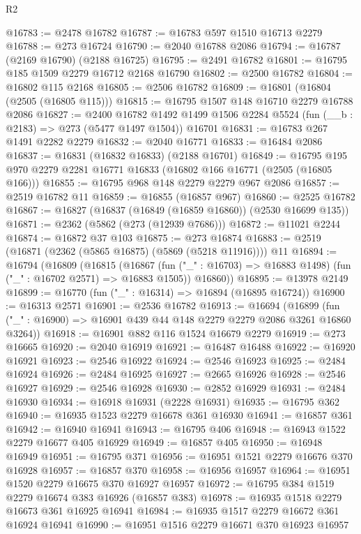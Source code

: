 \begin{lexlean}{R2}
\begin{coremodule}
@16783 := @2478 @16782
@16787 := @16783 @597 @1510 @16713 @2279
@16788 := @273 @16724
@16790 := @2040 @16788 @2086
@16794 := @16787 (@2169 @16790) (@2188 @16725)
@16795 := @2491 @16782
@16801 := @16795 @185 @1509 @2279 @16712 @2168 @16790
@16802 := @2500 @16782
@16804 := @16802 @115 @2168
@16805 := @2506 @16782
@16809 := @16801 (@16804 (@2505 (@16805 @115)))
@16815 := @16795 @1507 @148 @16710 @2279 @16788 @2086
@16827 := @2400
    @16782
    @1492
    @1499
    @1506
    @2284
    @5524
    (fun (__b : @2183) => @273 (@5477 @1497 @1504))
    @16701
@16831 := @16783 @267 @1491 @2282 @2279
@16832 := @2040 @16771
@16833 := @16484 @2086
@16837 := @16831 (@16832 @16833) (@2188 @16701)
@16849 := @16795 @195 @970 @2279 @2281 @16771 @16833 (@16802 @166 @16771 (@2505 (@16805 @166)))
@16855 := @16795 @968 @148 @2279 @2279 @967 @2086
@16857 := @2519 @16782 @11
@16859 := @16855 (@16857 @967)
@16860 := @2525 @16782
@16867 := @16827 (@16837 (@16849 (@16859 @16860)) (@2530 @16699 @135))
@16871 := @2362 (@5862 (@273 (@12939 @7686)))
@16872 := @11021 @2244
@16874 := @16872 @37 @103
@16875 := @273 @16874
@16883 := @2519 (@16871 (@2362 (@5865 @16875) (@5869 (@5218 @11916)))) @11
@16894 := @16794
    (@16809
      (@16815
        (@16867 (fun ("_" : @16703) => @16883 @1498) (fun ("_" : @16702 @2571) => @16883 @1505))
        @16860))
@16895 := @13978 @2149
@16899 := @16770 (fun ("_" : @16314) => @16894 (@16895 @16724))
@16900 := @16313 @2571
@16901 := @2536 @16782
@16913 := @16694
    (@16899 (fun ("_" : @16900) => @16901 @439 @44 @148 @2279 @2279 @2086 @3261 @16860 @3264))
@16918 := @16901 @882 @116 @1524 @16679 @2279
@16919 := @273 @16665
@16920 := @2040 @16919
@16921 := @16487 @16488
@16922 := @16920 @16921
@16923 := @2546 @16922
@16924 := @2546 @16923
@16925 := @2484 @16924
@16926 := @2484 @16925
@16927 := @2665 @16926
@16928 := @2546 @16927
@16929 := @2546 @16928
@16930 := @2852 @16929
@16931 := @2484 @16930
@16934 := @16918 @16931 (@2228 @16931)
@16935 := @16795 @362
@16940 := @16935 @1523 @2279 @16678 @361 @16930
@16941 := @16857 @361
@16942 := @16940 @16941
@16943 := @16795 @406
@16948 := @16943 @1522 @2279 @16677 @405 @16929
@16949 := @16857 @405
@16950 := @16948 @16949
@16951 := @16795 @371
@16956 := @16951 @1521 @2279 @16676 @370 @16928
@16957 := @16857 @370
@16958 := @16956 @16957
@16964 := @16951 @1520 @2279 @16675 @370 @16927 @16957
@16972 := @16795 @384 @1519 @2279 @16674 @383 @16926 (@16857 @383)
@16978 := @16935 @1518 @2279 @16673 @361 @16925 @16941
@16984 := @16935 @1517 @2279 @16672 @361 @16924 @16941
@16990 := @16951 @1516 @2279 @16671 @370 @16923 @16957

\end{coremodule}
\end{lexlean}
